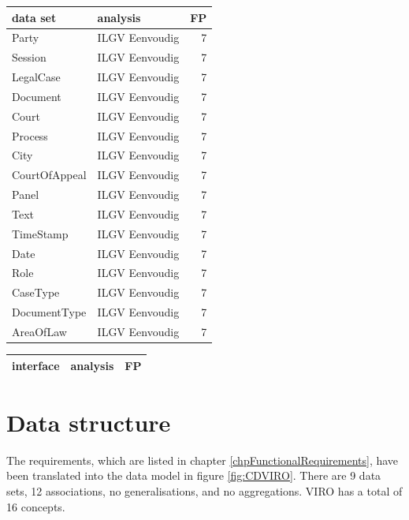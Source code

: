 \documentclass[10pt,a4paper]{report}              %
\theoremstyle{plain}\theorembodyfont{\rmfamily}\newtheorem{definition}{Definition}[section]
\theoremstyle{plain}\theorembodyfont{\rmfamily}\newtheorem{designrule}[definition]{Requirement}
\begin{document}
\begin{center}
\begin{tabular}{llr}
data set & analysis & FP\\
\hline
Party & ILGV Eenvoudig & 7\\
Session & ILGV Eenvoudig & 7\\
LegalCase & ILGV Eenvoudig & 7\\
Document & ILGV Eenvoudig & 7\\
Court & ILGV Eenvoudig & 7\\
Process & ILGV Eenvoudig & 7\\
City & ILGV Eenvoudig & 7\\
CourtOfAppeal & ILGV Eenvoudig & 7\\
Panel & ILGV Eenvoudig & 7\\
Text & ILGV Eenvoudig & 7\\
TimeStamp & ILGV Eenvoudig & 7\\
Date & ILGV Eenvoudig & 7\\
Role & ILGV Eenvoudig & 7\\
CaseType & ILGV Eenvoudig & 7\\
DocumentType & ILGV Eenvoudig & 7\\
AreaOfLaw & ILGV Eenvoudig & 7\\
\end{tabular}
\end{center}

\begin{center}
\begin{tabular}{llr}
interface & analysis & FP\\
\hline
\end{tabular}
\end{center}

\chapter{Data structure}\label{chpDataAnalysis}

The requirements, which are listed in chapter \ref{chpFunctionalRequirements}, have been translated into the data model in figure \ref{fig:CDVIRO}. There are 9 data sets, 12 associations, no generalisations, and no aggregations. VIRO has a total of 16 concepts.
\end{document}
